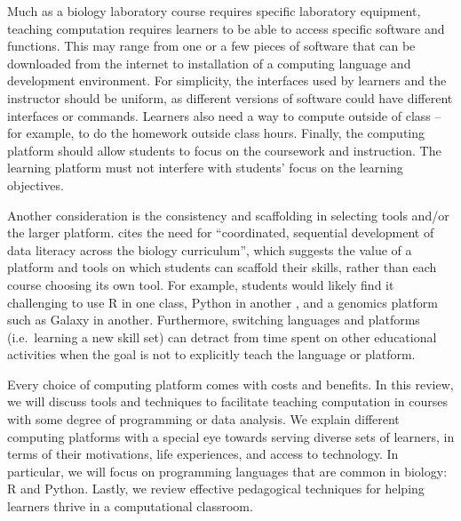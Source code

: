 Much as a biology laboratory course requires specific laboratory equipment, teaching computation requires learners to be able to access specific software and functions.
This may range from one or a few pieces of software that can be downloaded from the internet
to installation of a computing language and development environment.
For simplicity,
the interfaces used by learners and the instructor should be uniform, as different versions of software could have different interfaces or commands.
Learners also need  a way to compute outside of class -- for example, to do the homework outside class hours.
Finally, the computing platform should allow students to focus on the coursework and instruction. 
The learning platform must not interfere with students' focus on the learning objectives.

Another consideration is the consistency and scaffolding in selecting tools and/or the larger platform.
\citet{Gibson18} cites the need for ``coordinated, sequential development of data literacy across the biology curriculum'',
which suggests the value of a platform and tools on which students can scaffold their skills,
rather than each course choosing its own tool.
For example, students would likely find it challenging to use R in one class,
Python in another \citep{wu1990}, and a genomics platform such as Galaxy in another.
Furthermore, switching languages and platforms (i.e.\ learning a new skill set)
can detract from time spent on other educational activities when the goal is not to explicitly teach the language or platform.

Every choice of computing platform comes with costs and benefits. 
In this review, we will discuss tools and techniques to facilitate teaching computation in courses with some degree of programming or data analysis.
We explain different computing platforms with a special eye towards serving diverse sets of learners, 
in terms of their motivations, life experiences, and access to technology.
In particular, we will focus on programming languages that are common in biology: R and Python. 
Lastly, we review effective pedagogical techniques for helping learners thrive in a computational classroom.

